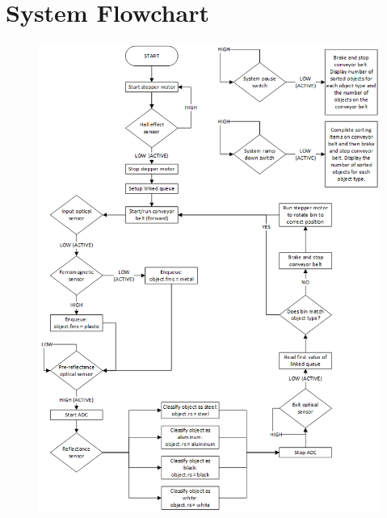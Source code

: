 \section{System Flowchart}\label{sec:flowchart}
\begin{figure}[tbph]
	\centering
	\includegraphics[width=0.80\linewidth]{"images/flowchart"}
	\label{fig:ABCD}
\end{figure}
